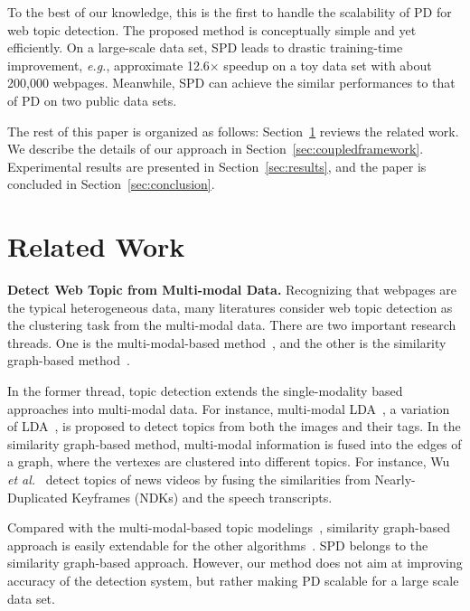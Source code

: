 \documentclass[runningheads]{llncs}
\begin{document}
To the best of our knowledge, this is the first to handle the scalability of PD for web topic detection. The proposed method is conceptually simple and yet efficiently. On a large-scale data set, SPD leads to drastic training-time improvement, \emph{e.g.}, approximate 12.6$\times$ speedup on a toy data set with about 200,000 webpages. Meanwhile, SPD can achieve the similar performances to that of PD on two public data sets.

The rest of this paper is organized as follows: Section~\ref{sec:relatedwork} reviews the related work. We describe the details of our approach in Section~\ref{sec:coupledframework}. Experimental results are presented in Section~\ref{sec:results}, and the paper is concluded in Section~\ref{sec:conclusion}.
%
%
%
\section{Related Work}
\label{sec:relatedwork}
\textbf{Detect Web Topic from Multi-modal Data.} Recognizing that webpages are the typical heterogeneous data, many literatures consider web topic detection as the clustering task from the multi-modal data. There are two important research threads. One is the multi-modal-based method~\cite{blei-lafferty-2007-correlatedtopicmodel,putthividhy-2010-multimodalLDA}, and the other is the similarity graph-based method~\cite{papadopoulos-2011-cluster}.

In the former thread, topic detection extends the single-modality based approaches into multi-modal data. For instance, multi-modal LDA~\cite{putthividhy-2010-multimodalLDA}, a variation of LDA~\cite{blei-2003-LDA}, is proposed to detect topics from both the images and their tags. In the similarity graph-based method, multi-modal information is fused into the edges of a graph, where the vertexes are clustered into different topics. For instance, Wu \emph{et al.}~\cite{wu-2007-crosslingual} detect topics of news videos by fusing the similarities from Nearly-Duplicated Keyframes (NDKs) and the speech transcripts.

Compared with the multi-modal-based topic modelings~\cite{putthividhy-2010-multimodalLDA}, similarity graph-based approach is easily extendable for the other algorithms~\cite{aiello-2013-sensing,papadopoulos-2011-cluster,cao-2011-tracking}. SPD belongs to the similarity graph-based approach. However, our method does not aim at improving accuracy of the detection system, but rather making PD scalable for a large scale data set.
\end{document}
